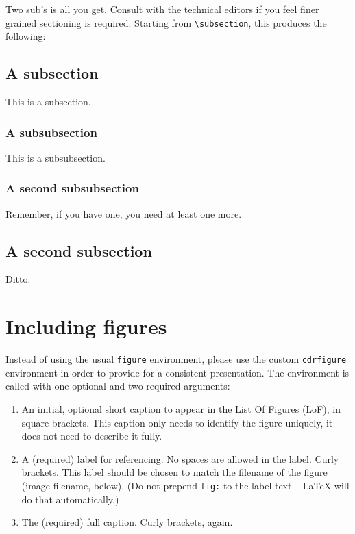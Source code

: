 Two sub's is all you get.  
Consult with the technical editors if you feel finer grained
sectioning is required.
Starting from \verb|\subsection|, this produces the following:

\subsection{A subsection}
\label{sec:latex-sec-sub}

This is a subsection.

\subsubsection{A subsubsection}
\label{sec:latex-sec-subsub}

This is a subsubsection.

\subsubsection{A second subsubsection}
\label{sec:latex-sec-subsub2}

Remember, if you have one, you need at least one more.

\subsection{A second subsection}
\label{sec:latex-sub2}

Ditto.

\section{Including figures}
\label{sec:latex-figures}

Instead of using the usual \texttt{figure} environment, please use the custom \texttt{cdrfigure}
environment in order to provide for a consistent presentation.
The environment is called with one optional and two required
arguments:

\begin{enumerate}
\item An initial, optional short caption to appear in the List Of Figures (LoF), in square brackets. This caption only needs to
identify the figure uniquely, it does not need to describe it fully.
\item A (required) label for referencing. No spaces are allowed in the label. Curly brackets. This label should be chosen to match the filename of the figure (image-filename, below). (Do not prepend \texttt{fig:} to the label text --  \LaTeX{} will do that automatically.)
\item The (required) full caption. Curly brackets, again.
\end{enumerate}


